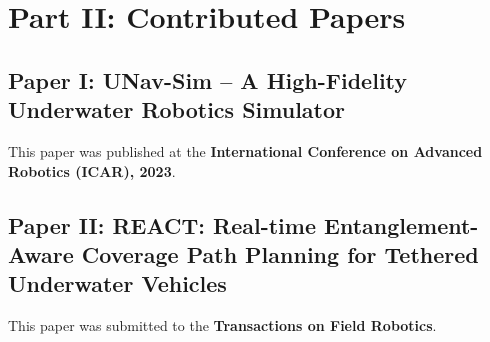 \documentclass[
10pt, %
b5paper, %
twoside, %
openright  %
]{book}  %
\begin{document}
 
 
 
 
 


 
 
  

%
%
%

% 




\part*{Part II: Contributed Papers}
 \label{partII:paper}


\chapter*{Paper I: UNav-Sim – A High-Fidelity Underwater Robotics Simulator}
\vspace{1cm}
This paper was published at the \textbf{International Conference on Advanced Robotics (ICAR), 2023}.
 



\chapter*{Paper II: REACT: Real-time Entanglement-Aware Coverage
Path Planning for Tethered Underwater Vehicles}
\vspace{1cm}
This paper was submitted to the \textbf{Transactions on Field Robotics}.
 
\end{document}
